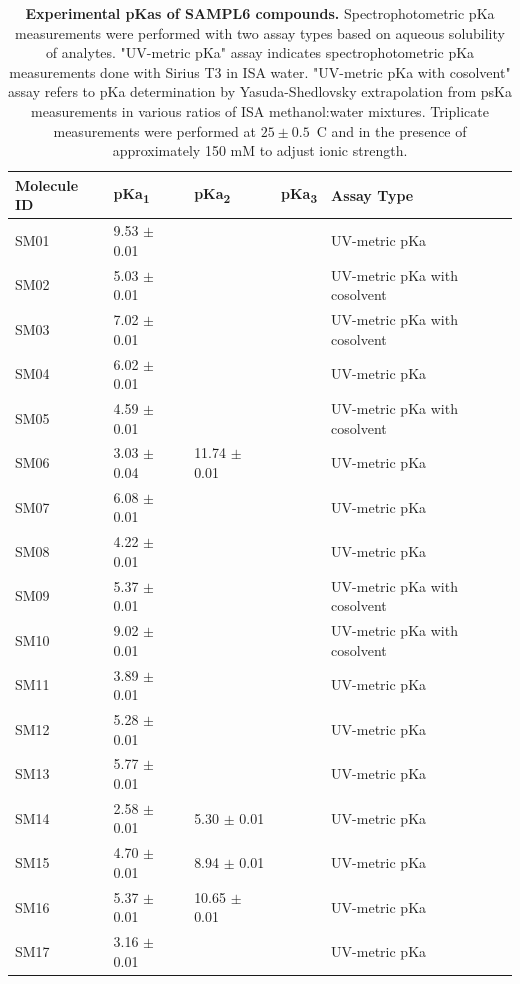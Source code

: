 \documentclass[9pt,lineno]{elife}
\begin{document}
\begin{table}[tb!]
\begin{center}
\begin{threeparttable}
\centering
\caption{{\bf Experimental pKas of SAMPL6 compounds.} Spectrophotometric pKa measurements were performed with two assay types based on aqueous solubility of analytes. "UV-metric pKa" assay indicates spectrophotometric pKa measurements done with Sirius T3 in ISA water. "UV-metric pKa with cosolvent" assay refers to pKa determination by Yasuda-Shedlovsky extrapolation from psKa measurements in various ratios of ISA methanol:water mixtures. Triplicate measurements were performed at $25 \pm 0.5$~\textdegree C and in the presence of approximately 150 mM  to adjust ionic strength.} 
\label{my-label}
\begin{tabular}{@{}lllll@{}}
\toprule
Molecule ID & pKa\textsubscript{1} & pKa\textsubscript{2} & pKa\textsubscript{3} & Assay Type \\ \midrule
SM01 & 9.53 $\pm$ 0.01 &  &  & UV-metric pKa \\
SM02 & 5.03 $\pm$ 0.01 &  &  & UV-metric pKa with cosolvent \\
SM03 & 7.02 $\pm$ 0.01 &  &  & UV-metric pKa with cosolvent \\
SM04 & 6.02 $\pm$ 0.01 &  &  & UV-metric pKa \\
SM05 & 4.59 $\pm$ 0.01 &  &  & UV-metric pKa with cosolvent \\
SM06 & 3.03 $\pm$ 0.04 & 11.74 $\pm$ 0.01 &  & UV-metric pKa \\
SM07 & 6.08 $\pm$ 0.01 &  &  & UV-metric pKa \\
SM08 & 4.22 $\pm$ 0.01 &  &  & UV-metric pKa \\
SM09 & 5.37 $\pm$ 0.01 &  &  & UV-metric pKa with cosolvent \\
SM10 & 9.02 $\pm$ 0.01 &  &  & UV-metric pKa with cosolvent \\
SM11 & 3.89 $\pm$ 0.01 &  &  & UV-metric pKa \\
SM12 & 5.28 $\pm$ 0.01 &  &  & UV-metric pKa \\
SM13 & 5.77 $\pm$ 0.01 &  &  & UV-metric pKa \\
SM14 & 2.58 $\pm$ 0.01 & 5.30 $\pm$ 0.01 &  & UV-metric pKa \\
SM15 & 4.70 $\pm$ 0.01 & 8.94 $\pm$ 0.01 &  & UV-metric pKa \\
SM16 & 5.37 $\pm$ 0.01 & 10.65 $\pm$ 0.01 &  & UV-metric pKa \\
SM17 & 3.16 $\pm$ 0.01 &  &  & UV-metric pKa \\

\end{tabular}
\end{threeparttable}
\end{center}
\end{table}
\end{document}
